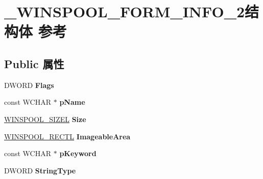 \hypertarget{struct___w_i_n_s_p_o_o_l___f_o_r_m___i_n_f_o__2}{}\section{\+\_\+\+W\+I\+N\+S\+P\+O\+O\+L\+\_\+\+F\+O\+R\+M\+\_\+\+I\+N\+F\+O\+\_\+2结构体 参考}
\label{struct___w_i_n_s_p_o_o_l___f_o_r_m___i_n_f_o__2}
\subsection*{Public 属性}
\begin{DoxyCompactItemize}
\item 
\mbox{\label{struct___w_i_n_s_p_o_o_l___f_o_r_m___i_n_f_o__2_a8264a56d03679cf11cec395c51b90865}} 
D\+W\+O\+RD {\bfseries Flags}
\item 
\mbox{\label{struct___w_i_n_s_p_o_o_l___f_o_r_m___i_n_f_o__2_a15b1fd4aecdd94d629258f08673648fd}} 
const W\+C\+H\+AR $\ast$ {\bfseries p\+Name}
\item 
\mbox{\label{struct___w_i_n_s_p_o_o_l___f_o_r_m___i_n_f_o__2_ac89a51ee445b88ba5b5b80bedde6ec57}} 
\hyperlink{struct___w_i_n_s_p_o_o_l___s_i_z_e_l}{W\+I\+N\+S\+P\+O\+O\+L\+\_\+\+S\+I\+Z\+EL} {\bfseries Size}
\item 
\mbox{\label{struct___w_i_n_s_p_o_o_l___f_o_r_m___i_n_f_o__2_af50aa31780df0d12c994e1204f9e004a}} 
\hyperlink{struct___w_i_n_s_p_o_o_l___r_e_c_t_l}{W\+I\+N\+S\+P\+O\+O\+L\+\_\+\+R\+E\+C\+TL} {\bfseries Imageable\+Area}
\item 
\mbox{\label{struct___w_i_n_s_p_o_o_l___f_o_r_m___i_n_f_o__2_aa08e218b0ae428991110e7e2e12e7c83}} 
const W\+C\+H\+AR $\ast$ {\bfseries p\+Keyword}
\item 
\mbox{\label{struct___w_i_n_s_p_o_o_l___f_o_r_m___i_n_f_o__2_a1d4e84e448144876fcfafa65c5ddd114}} 
D\+W\+O\+RD {\bfseries String\+Type}

\end{DoxyCompactItemize}

